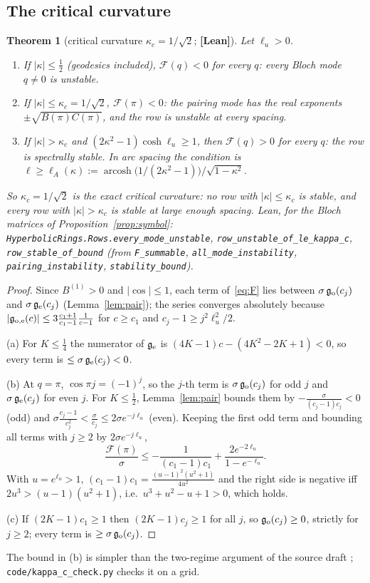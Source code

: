 \documentclass[11pt]{article}
\newtheorem{theorem}{Theorem}[section]
\theoremstyle{definition}
\theoremstyle{remark}
\newcommand{\st}[1]{\textbf{[#1]}}
\newcommand{\lean}[1]{\nolinkurl{#1}}
\begin{document}
\subsection{The critical curvature}
\begin{theorem}[critical curvature $\kappa_c=1/\sqrt2$; \st{Lean}]\label{thm:kappac}
Let $\ell_u>0$.
\begin{enumerate}
\item[(a)] If $|\kappa|\le\frac12$ (geodesics included), $\mathcal F(q)<0$ for every $q$: every Bloch mode $q\ne0$ is unstable.
\item[(b)] If $|\kappa|\le\kappa_c=1/\sqrt2$, $\mathcal F(\pi)<0$: the pairing mode has the real exponents $\pm\sqrt{B(\pi)C(\pi)}$, and
the row is unstable at every spacing.
\item[(c)] If $|\kappa|>\kappa_c$ and $(2\kappa^2-1)\cosh\ell_u\ge1$, then $\mathcal F(q)>0$ for every $q$: the row is spectrally stable.
In arc spacing the condition is $\ell\ge\ell_A(\kappa):=\operatorname{arcosh}\!\big(1/(2\kappa^2-1)\big)/\sqrt{1-\kappa^2}$.
\end{enumerate}
So $\kappa_c=1/\sqrt2$ is the exact critical curvature: no row with $|\kappa|\le\kappa_c$ is stable, and every row with
$|\kappa|>\kappa_c$ is stable at large enough spacing. Lean, for the Bloch matrices of Proposition~\ref{prop:symbol}:
\lean{HyperbolicRings.Rows.every_mode_unstable}, \lean{row_unstable_of_le_kappa_c}, \lean{row_stable_of_bound} (from
\lean{F_summable}, \lean{all_mode_instability}, \lean{pairing_instability}, \lean{stability_bound}).
\end{theorem}
\begin{proof}
Since $B^{(1)}>0$ and $|\cos|\le1$, each term of~\eqref{eq:F} lies between $\sigma\,\mathfrak g_{\rm o}(c_j)$ and $\sigma\,\mathfrak g_{\rm e}(c_j)$
(Lemma~\ref{lem:pair}); the series converges absolutely because $|\mathfrak g_{\rm o,e}(c)|\le3\frac{c_1+1}{c_1-1}\frac1{c-1}$ for
$c\ge c_1$ and $c_j-1\ge j^2\ell_u^2/2$.

(a) For $K\le\frac14$ the numerator of $\mathfrak g_{\rm e}$ is $(4K-1)c-(4K^2-2K+1)<0$, so every term is
$\le \sigma\,\mathfrak g_{\rm e}(c_j)<0$.

(b) At $q=\pi$, $\cos\pi j=(-1)^j$, so the $j$-th term is $\sigma\,\mathfrak g_{\rm o}(c_j)$ for odd $j$ and $\sigma\,\mathfrak g_{\rm e}(c_j)$ for even
$j$. For $K\le\frac12$, Lemma~\ref{lem:pair} bounds them by $-\frac{\sigma}{(c_j-1)c_j}<0$ (odd) and $\sigma\frac{c_j-1}{c_j^2}<\frac \sigma{c_j}\le2\sigma e^{-j\ell_u}$
(even). Keeping the first odd term and bounding all terms with $j\ge2$ by $2\sigma e^{-j\ell_u}$,
\[
\frac{\mathcal F(\pi)}\sigma\le-\frac1{(c_1-1)c_1}+\frac{2e^{-2\ell_u}}{1-e^{-\ell_u}} .
\]
With $u=e^{\ell_u}>1$, $(c_1-1)c_1=\frac{(u-1)^2(u^2+1)}{4u^2}$ and the right side is negative iff $2u^3>(u-1)(u^2+1)$, i.e.\
$u^3+u^2-u+1>0$, which holds.

(c) If $(2K-1)c_1\ge1$ then $(2K-1)c_j\ge1$ for all $j$, so $\mathfrak g_{\rm o}(c_j)\ge0$, strictly for $j\ge2$; every term is
$\ge \sigma\,\mathfrak g_{\rm o}(c_j)$.
\end{proof}
The bound in (b) is simpler than the two-regime argument of the source draft \cite{HavelockRepo}; \nolinkurl{code/kappa_c_check.py}
checks it on a grid.
\end{document}
